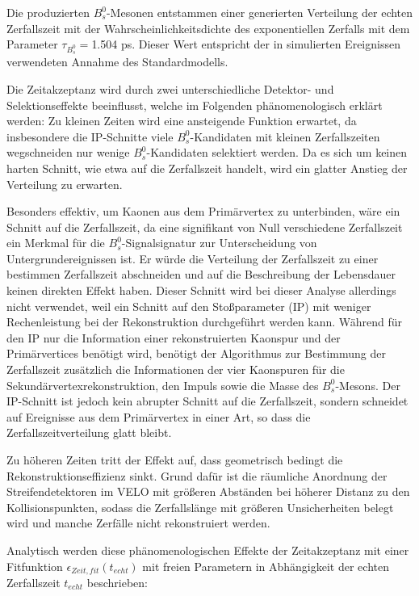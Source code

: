 \documentclass{article}
\begin{document}
Die produzierten $B_s^0$-Mesonen entstammen einer generierten Verteilung der echten Zerfallszeit mit der Wahrscheinlichkeitsdichte des exponentiellen Zerfalls mit dem Parameter $\tau_{B_s^0}=$1.504 ps. Dieser Wert entspricht der in simulierten Ereignissen verwendeten Annahme des Standardmodells.

Die Zeitakzeptanz wird durch zwei unterschiedliche Detektor- und Selektionseffekte beeinflusst, welche im Folgenden phänomenologisch erklärt werden: Zu kleinen Zeiten wird eine ansteigende Funktion erwartet, da insbesondere die IP-Schnitte viele $B_s^0$-Kandidaten mit kleinen Zerfallszeiten wegschneiden nur wenige $B_s^0$-Kandidaten selektiert werden. Da es sich um keinen harten Schnitt, wie etwa auf die Zerfallszeit handelt, wird ein glatter Anstieg der Verteilung zu erwarten. 

Besonders effektiv, um Kaonen aus dem Primärvertex zu unterbinden, wäre ein Schnitt auf die Zerfallszeit, da eine signifikant von Null verschiedene Zerfallszeit ein Merkmal für die $B_s^0$-Signalsignatur zur Unterscheidung von Untergrundereignissen ist. Er würde die Verteilung der Zerfallszeit zu einer bestimmen Zerfallszeit abschneiden und auf die Beschreibung der Lebensdauer keinen direkten Effekt haben. Dieser Schnitt wird bei dieser Analyse allerdings nicht verwendet, weil ein Schnitt auf den Stoßparameter (IP) mit weniger Rechenleistung bei der Rekonstruktion durchgeführt werden kann. Während für den IP nur die Information einer rekonstruierten Kaonspur und der Primärvertices benötigt wird, benötigt der Algorithmus zur Bestimmung der Zerfallszeit zusätzlich die Informationen der vier Kaonspuren für die Sekundärvertexrekonstruktion, den Impuls sowie die Masse des $B_s^0$-Mesons. Der IP-Schnitt ist jedoch kein abrupter Schnitt auf die Zerfallszeit, sondern schneidet auf Ereignisse aus dem Primärvertex in einer Art, so dass die Zerfallszeitverteilung glatt bleibt.


Zu höheren Zeiten tritt der Effekt auf, dass geometrisch bedingt die Rekonstruktionseffizienz sinkt. Grund dafür ist die räumliche Anordnung der Streifendetektoren im VELO mit größeren Abständen bei höherer Distanz zu den Kollisionspunkten, sodass die Zerfallslänge mit größeren Unsicherheiten belegt wird und manche Zerfälle nicht rekonstruiert werden. 

Analytisch werden diese phänomenologischen Effekte der Zeitakzeptanz mit einer Fitfunktion $\epsilon_{Zeit,fit}(t_{echt})$ mit freien Parametern in Abhängigkeit der echten Zerfallszeit $t_{echt}$ beschrieben:
\end{document}
